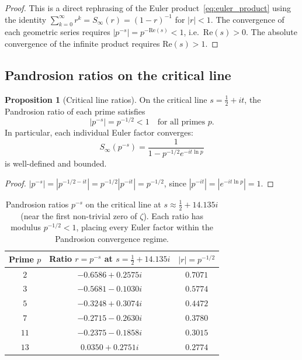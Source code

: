 \documentclass[11pt,a4paper]{article}
\theoremstyle{definition}
\newtheorem{proposition}{Proposition}[section]
\begin{document}
\begin{proof}
This is a direct rephrasing of the Euler product~\eqref{eq:euler_product} using the identity $\sum_{k=0}^{\infty} r^k = S_\infty(r) = (1-r)^{-1}$ for $|r| < 1$.  The convergence of each geometric series requires $|p^{-s}| = p^{-\mathrm{Re}(s)} < 1$, i.e.\ $\mathrm{Re}(s) > 0$.  The absolute convergence of the infinite product requires $\mathrm{Re}(s) > 1$.
\end{proof}

\subsection{Pandrosion ratios on the critical line}

\begin{proposition}[Critical line ratios]
\label{prop:critical_line}
On the critical line $s = \tfrac{1}{2} + it$, the Pandrosion ratio of each prime satisfies
\begin{equation}
  \label{eq:critical_ratio}
  |p^{-s}| = p^{-1/2} < 1 \quad \text{for all primes } p.
\end{equation}
In particular, each individual Euler factor converges:
\[
  S_\infty(p^{-s}) = \frac{1}{1 - p^{-1/2} e^{-it \ln p}}
\]
is well-defined and bounded.
\end{proposition}

\begin{proof}
$|p^{-s}| = |p^{-1/2 - it}| = p^{-1/2} |p^{-it}| = p^{-1/2}$, since $|p^{-it}| = |e^{-it \ln p}| = 1$.
\end{proof}

\begin{table}[h]
\centering
\begin{tabular}{ccc}
\toprule
Prime $p$ & Ratio $r = p^{-s}$ at $s = \tfrac{1}{2} + 14.135i$ & $|r| = p^{-1/2}$ \\
\midrule
$2$ & $-0.6586 + 0.2575i$ & $0.7071$ \\
$3$ & $-0.5681 - 0.1030i$ & $0.5774$ \\
$5$ & $-0.3248 + 0.3074i$ & $0.4472$ \\
$7$ & $-0.2715 - 0.2630i$ & $0.3780$ \\
$11$ & $-0.2375 - 0.1858i$ & $0.3015$ \\
$13$ & $0.0350 + 0.2751i$ & $0.2774$ \\
\bottomrule
\end{tabular}
\caption{Pandrosion ratios $p^{-s}$ on the critical line at $s \approx \tfrac{1}{2} + 14.135i$ (near the first non-trivial zero of $\zeta$).  Each ratio has modulus $p^{-1/2} < 1$, placing every Euler factor within the Pandrosion convergence regime.}
\label{tab:critical_ratios}
\end{table}
\end{document}
